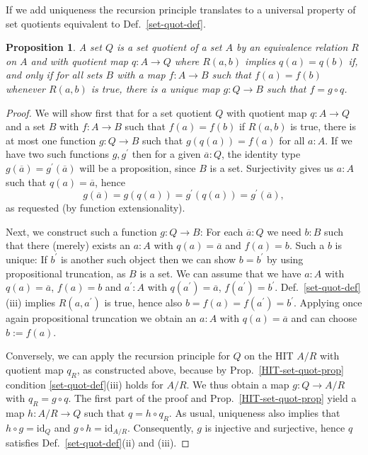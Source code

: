 \documentclass{amsart}
\theoremstyle{plain}
\numberwithin{equation}{section} %
\numberwithin{figure}{section} %
\theoremstyle{plain}
\theoremstyle{plain}
\theoremstyle{plain}
\theoremstyle{plain}
\theoremstyle{plain}
\newtheorem{prop}[thm]{Proposition} %
\theoremstyle{plain}
\theoremstyle{remark}
\theoremstyle{remark}
\theoremstyle{remark}
\begin{document}
If we add uniqueness the recursion principle translates to a universal property of set quotients equivalent to Def.~\ref{set-quot-def}.
\begin{prop} \label{set-quot-univ-prop}  %
A set $Q$ is a set quotient of a set $A$ by an equivalence relation $R$ on $A$ and with quotient map $q : A \rightarrow Q$ where $R(a, b)$ implies $q(a) = q(b)$ if, and only if for all sets $B$ with a map $f : A \rightarrow B$ such that $f(a) = f(b)$ whenever $R(a, b)$ is true, there is a unique map $g : Q \rightarrow B$ such that $f = g \circ q$.
\end{prop}
\begin{proof}
We will show first that for a set quotient $Q$ with quotient map $q : A \rightarrow Q$ and a set $B$ with $f : A \rightarrow B$ such that $f(a) = f(b)$ if $R(a, b)$ is true, there is at most one function $g : Q \rightarrow B$ such that $g(q(a)) = f(a)$ for all $a : A$. If we have two such functions $g, g^\prime$ then for a given $\overline{a} : Q$, the identity type $g(\overline{a}) = g^\prime(\overline{a})$ will be a proposition, since $B$ is a set. Surjectivity gives us $a : A$ such that $q(a) = \overline{a}$, hence 
\[ g(\overline{a}) = g(q(a)) = g^\prime(q(a)) = g^\prime(\overline{a}), \]
as requested (by function extensionality).

Next, we construct such a function $g : Q \rightarrow B$: For each $\overline{a} : Q$ we need $b : B$ such that there (merely) exists an $a : A$ with $q(a) = \overline{a}$ and $f(a) = b$. Such a $b$ is unique: If $b^\prime$ is another such object then we can show $b = b^\prime$ by using propositional truncation, as $B$ is a set. We can assume that we have $a : A$ with $q(a) = \overline{a}$, $f(a) = b$ and $a^\prime : A$ with $q(a^\prime) = \overline{a}$, $f(a^\prime) = b^\prime$. Def.~\ref{set-quot-def}(iii) implies $R(a, a^\prime)$ is true, hence also $b = f(a) = f(a^\prime) = b^\prime$. Applying once again propositional truncation we obtain an $a : A$ with $q(a) = \overline{a}$ and can choose $b := f(a)$.

Conversely, we can apply the recursion principle for $Q$ on the HIT $A/R$ with quotient map $q_R$, as constructed above, because by Prop.~\ref{HIT-set-quot-prop} condition \ref{set-quot-def}(iii) holds for $A/R$. We thus obtain a map $g : Q \rightarrow A/R$ with $q_R = g \circ q$. The first part of the proof and Prop.~\ref{HIT-set-quot-prop} yield a map $h : A/R \rightarrow Q$ such that $q = h \circ q_R$. As usual, uniqueness also implies that $h \circ g = \mathrm{id}_Q$ and $g \circ h = \mathrm{id}_{A/R}$. Consequently, $g$ is injective and surjective, hence $q$ satisfies Def.~\ref{set-quot-def}(ii) and (iii).
\end{proof}
\end{document}

